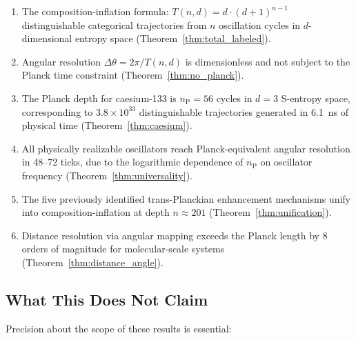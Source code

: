 \documentclass[twocolumn,10pt,a4paper]{article}
\theoremstyle{definition}
\theoremstyle{remark}
\newcommand{\nP}{n_{\mathrm{P}}}
\begin{document}
\begin{enumerate}[label=(\arabic*)]
\item The composition-inflation formula: $T(n,d) = d \cdot (d+1)^{n-1}$ distinguishable categorical trajectories from $n$ oscillation cycles in $d$-dimensional entropy space (Theorem~\ref{thm:total_labeled}).

\item Angular resolution $\Delta\theta = 2\pi / T(n,d)$ is dimensionless and not subject to the Planck time constraint (Theorem~\ref{thm:no_planck}).

\item The Planck depth for caesium-133 is $\nP = 56$ cycles in $d = 3$ S-entropy space, corresponding to $3.8 \times 10^{33}$ distinguishable trajectories generated in 6.1~ns of physical time (Theorem~\ref{thm:caesium}).

\item All physically realizable oscillators reach Planck-equivalent angular resolution in 48--72 ticks, due to the logarithmic dependence of $\nP$ on oscillator frequency (Theorem~\ref{thm:universality}).

\item The five previously identified trans-Planckian enhancement mechanisms unify into composition-inflation at depth $n \approx 201$ (Theorem~\ref{thm:unification}).

\item Distance resolution via angular mapping exceeds the Planck length by 8 orders of magnitude for molecular-scale systems (Theorem~\ref{thm:distance_angle}).
\end{enumerate}

\subsection{What This Does Not Claim}

Precision about the scope of these results is essential:
\end{document}
